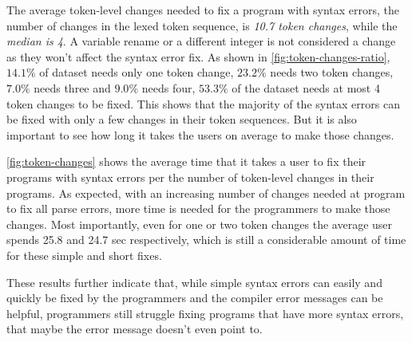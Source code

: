 The average token-level changes needed to fix a program with syntax errors, \ie
the number of changes in the lexed token sequence, is \emph{10.7 token changes},
while the \emph{median is 4}. A variable rename or a different integer is not
considered a change as they won't affect the syntax error fix. As shown in
\autoref{fig:token-changes-ratio}, $14.1\%$ of dataset needs only one token
change, $23.2\%$ needs two token changes, $7.0\%$ needs three and $9.0\%$ needs
four, \ie $53.3\%$ of the dataset needs at most 4 token changes to be fixed.
This shows that the majority of the syntax errors can be fixed with only a few
changes in their token sequences. But it is also important to see how long it
takes the users on average to make those changes.

\autoref{fig:token-changes} shows the average time that it takes a user to fix
their programs with syntax errors per the number of token-level changes in their
programs. As expected, with an increasing number of changes needed at program to
fix all parse errors, more time is needed for the programmers to make those
changes. Most importantly, even for one or two token changes the average user
spends 25.8 and 24.7 sec respectively, which is still a considerable amount of
time for these simple and short fixes.

These results further indicate that, while simple syntax errors can easily and
quickly be fixed by the programmers and the compiler error messages can be
helpful, programmers still struggle fixing programs that have more syntax
errors, that maybe the error message doesn't even point to.
